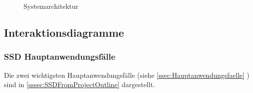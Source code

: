 \documentclass[11pt,ngerman]{article}
\begin{document}
    \begin{figure}[H]
        \centering
        \caption{Systemarchitektur}
        \label{fig:Systemarchitecture}
    \end{figure}

    \subsection{Interaktionsdiagramme}

    \subsubsection{SSD Hauptanwendungsfälle}
    Die zwei wichtigsten Hauptanwendungsfälle (siehe \ref{ssec:Hauptanwendungsfaelle}  ) sind in \ref{sssec:SSDFromProjectOutline}  dargestellt.
\end{document}
